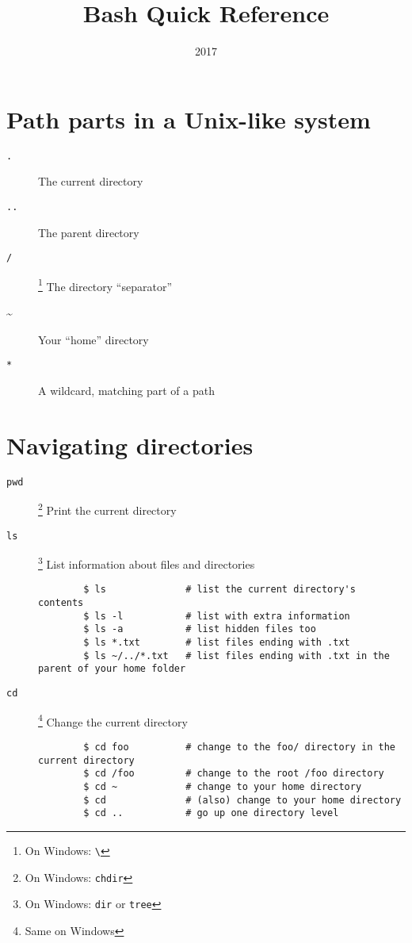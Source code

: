 \documentclass[a4paper]{tufte-handout}
\title{Bash Quick Reference}
\date{2017}
\begin{document}
\maketitle

\section{Path parts in a Unix-like system}

\begin{description}
    \item [\texttt{.}]
        \hfill The current directory
    \item [\texttt{..}]
        \hfill The parent directory
    \item [\texttt{/}]
        \footnote{On Windows: \texttt{\textbackslash}}
        \hfill The directory \enquote{separator}
    \item [\textasciitilde]
        \hfill Your \enquote{home} directory
    \item [\texttt{*}] \hfill A wildcard, matching part of a path \end{description}

\hrulefill{}

\section{Navigating directories}

\begin{description}
    \item [\texttt{pwd}]
        \footnote{On Windows: \texttt{chdir}}
        \hfill Print the current directory
    \item [\texttt{ls}]
        \footnote{On Windows: \texttt{dir} or \texttt{tree}}
        \hfill List information about files and directories
        \begin{verbatim}
        $ ls              # list the current directory's contents
        $ ls -l           # list with extra information
        $ ls -a           # list hidden files too
        $ ls *.txt        # list files ending with .txt
        $ ls ~/../*.txt   # list files ending with .txt in the parent of your home folder
        \end{verbatim}
    \item [\texttt{cd}]
        \footnote{Same on Windows}
        \hfill Change the current directory
        \begin{verbatim}
        $ cd foo          # change to the foo/ directory in the current directory
        $ cd /foo         # change to the root /foo directory
        $ cd ~            # change to your home directory
        $ cd              # (also) change to your home directory
        $ cd ..           # go up one directory level
        \end{verbatim}
\end{description}
\end{document}
